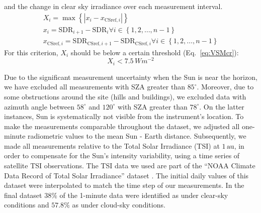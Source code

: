 \documentclass[applsci,article,submit,moreauthors,pdftex]{Definitions/mdpi}
\begin{document}
\begin{enumerate}
  and the change in clear sky irradiance over each measurement interval.
  \begin{gather}
    X_i = \max{\left \{ \left | x_i - x_{\text{CSref},i} \right | \right \}} \label{eq:VSM3} \\
    x_i = \text{SDR}_{i+1} - \text{SDR}_{i} \forall i \in \left \{ 1, 2, \ldots, n-1 \right \} \label{eq:VSM1} \\
    x_{\text{CSref},i} = \text{SDR}_{\text{CSref},i+1} - \text{SDR}_{\text{CSref},i} \forall i \in \left \{ 1, 2, \ldots, n-1 \right \} \label{eq:VSM2}
  \end{gather} For this criterion, \(X_i\) should be below a certain
  threshold (Eq.~\ref{eq:VSMcr}): \begin{equation}
    X_i < 7.5\,Wm^{-2} \label{eq:VSMcr}
  \end{equation}
\end{enumerate}

Due to the significant measurement uncertainty when the Sun is near the
horizon, we have excluded all measurements with SZA greater than
\(85^\circ\). Moreover, due to some obstructions around the site (hills
and buildings), we excluded data with azimuth angle between \(58^\circ\)
and \(120^\circ\) with SZA greater than \(78^\circ\). On the latter
instances, Sun is systematically not visible from the instrument's
location. To make the measurements comparable throughout the dataset, we
adjusted all one-minute radiometric values to the mean Sun - Earth
distance. Subsequently, we made all measurements relative to the Total
Solar Irradiance (TSI) at \(1\,\text{au}\), in order to compensate for
the Sun's intensity variability, using a time series of satellite TSI
observations. The TSI data we used are part of the ``NOAA Climate Data
Record of Total Solar Irradiance'' dataset \citep{Coddington2005}. The
initial daily values of this dataset were interpolated to match the time
step of our measurements. In the final dataset \(38\%\) of the 1-minute
data were identified as under clear-sky conditions and \(57.8\%\) as
under cloud-sky conditions.
\end{document}
